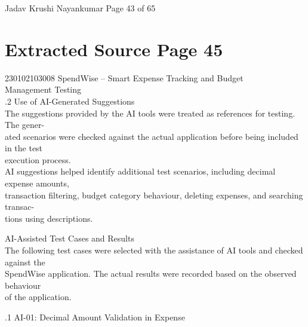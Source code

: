 \documentclass[12pt,a4paper]{report}
\begin{document}
\smallskip

\smallskip

\smallskip

\smallskip
Jadav Krushi Nayankumar                                                     Page 43 of 65\\ 

\clearpage
\section*{Extracted Source Page 45}
230102103008                          SpendWise – Smart Expense Tracking and Budget\\ 
Management Testing\\ 

.2 Use of AI-Generated Suggestions\\ 

\smallskip
The suggestions provided by the AI tools were treated as references for testing. The gener-\\ 
ated scenarios were checked against the actual application before being included in the test\\ 
execution process.\\ 
AI suggestions helped identify additional test scenarios, including decimal expense amounts,\\ 
transaction filtering, budget category behaviour, deleting expenses, and searching transac-\\ 
tions using descriptions.\\ 

\smallskip

 AI-Assisted Test Cases and Results\\ 

\smallskip
The following test cases were selected with the assistance of AI tools and checked against the\\ 
SpendWise application. The actual results were recorded based on the observed behaviour\\ 
of the application.\\ 

\smallskip

.1 AI-01: Decimal Amount Validation in Expense\\ 

\smallskip
\end{document}
